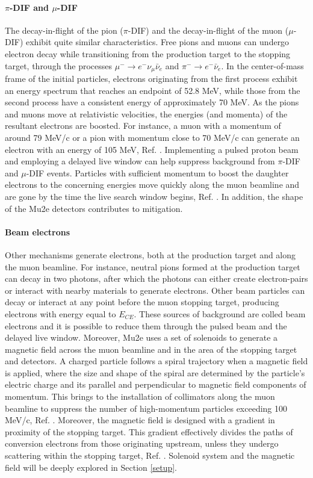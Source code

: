 \paragraph{$\pi$-DIF and $\mu$-DIF}
The decay-in-flight of the pion ($\pi$-DIF) and the decay-in-flight of the muon ($\mu$-DIF) exhibit quite similar characteristics. Free pions and muons can undergo electron decay while transitioning from the production target to the stopping target, through the processes $\mu^- \rightarrow e^- \nu_\mu \bar{\nu}_e$ and $\pi^- \rightarrow e^- \bar{\nu}_e$. In the center-of-mass frame of the initial particles, electrons originating from the first process exhibit an energy spectrum that reaches an endpoint of 52.8 MeV, while those from the second process have a consistent energy of approximately 70 MeV. As the pions and muons move at relativistic velocities, the energies (and momenta) of the resultant electrons are boosted. For instance, a muon with a momentum of around 79 MeV/c or a pion with momentum close to 70 MeV/c can generate an electron with an energy of 105 MeV, Ref. \cite{bartoszek2015mu2e}. Implementing a pulsed proton beam and employing a delayed live window can help suppress background from $\pi$-DIF and $\mu$-DIF events. Particles with sufficient momentum to boost the daughter electrons to the concerning energies move quickly along the muon beamline and are gone by the time the live search window begins, Ref. \cite{bobbb}. In addition, the shape of the Mu2e detectors contributes to mitigation.
\paragraph{Beam electrons}\label{beamelectrons}
Other mechanisms generate electrons, both at the production target and along the muon beamline. For instance, neutral pions formed at the production target can decay in two photons, after which the photons can either create electron-pairs or interact with nearby materials to generate electrons. Other beam particles can decay or interact at any point before the muon stopping target, producing electrons with energy equal to $E_{CE}$. These sources of background are colled beam electrons and it is possible to reduce them through the pulsed beam and the delayed live window. Moreover, Mu2e uses a set of solenoids to generate a magnetic field across the muon beamline and in the area of the stopping target and detectors. A charged particle follows a spiral trajectory when a magnetic field is applied, where the size and shape of the spiral are determined by the particle's electric charge and its parallel and perpendicular to magnetic field components of momentum. This brings to the installation of collimators along the muon beamline to suppress the number of high-momentum particles exceeding 100 MeV/c, Ref. \cite{bartoszek2015mu2e}. Moreover, the magnetic field is designed with a gradient in proximity of the stopping target. This gradient effectively divides the paths of conversion electrons from those originating upstream, unless they undergo scattering within the stopping target, Ref. \cite{bobbb}. Solenoid system and the magnetic field will be deeply explored in Section \ref{setup}.
